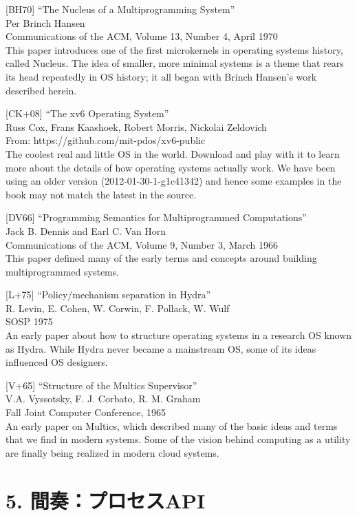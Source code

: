{[}BH70{]} ``The Nucleus of a Multiprogramming System''\\
Per Brinch Hansen\\
Communications of the ACM, Volume 13, Number 4, April 1970\\
This paper introduces one of the first microkernels in operating systems
history, called Nucleus. The idea of smaller, more minimal systems is a
theme that rears its head repeatedly in OS history; it all began with
Brinch Hansen's work described herein.

{[}CK+08{]} ``The xv6 Operating System''\\
Russ Cox, Frans Kaashoek, Robert Morris, Nickolai Zeldovich\\
From: https://github.com/mit-pdos/xv6-public\\
The coolest real and little OS in the world. Download and play with it
to learn more about the details of how operating systems actually work.
We have been using an older version (2012-01-30-1-g1c41342) and hence
some examples in the book may not match the latest in the source.

{[}DV66{]} ``Programming Semantics for Multiprogrammed Computations''\\
Jack B. Dennis and Earl C. Van Horn\\
Communications of the ACM, Volume 9, Number 3, March 1966\\
This paper defined many of the early terms and concepts around building
multiprogrammed systems.

{[}L+75{]} ``Policy/mechanism separation in Hydra''\\
R. Levin, E. Cohen, W. Corwin, F. Pollack, W. Wulf\\
SOSP 1975\\
An early paper about how to structure operating systems in a research OS
known as Hydra. While Hydra never became a mainstream OS, some of its
ideas influenced OS designers.

{[}V+65{]} ``Structure of the Multics Supervisor''\\
V.A. Vyssotsky, F. J. Corbato, R. M. Graham\\
Fall Joint Computer Conference, 1965\\
An early paper on Multics, which described many of the basic ideas and
terms that we find in modern systems. Some of the vision behind
computing as a utility are finally being realized in modern cloud
systems.

\newpage

\hypertarget{ux9593ux594fux30d7ux30edux30bbux30b9api}{%
\section*{5.
間奏：プロセスAPI}\label{ux9593ux594fux30d7ux30edux30bbux30b9api}}

